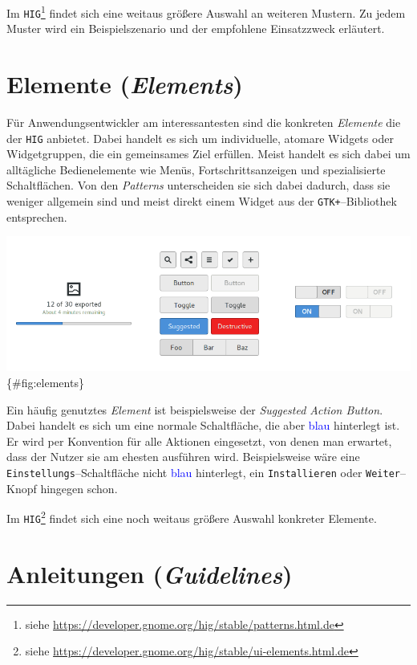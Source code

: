\documentclass[11pt,ngerman,toc=listof,index=totoc]{scrreprt}
\begin{document}
Im \texttt{HIG}\footnote{siehe
  \url{https://developer.gnome.org/hig/stable/patterns.html.de}} findet
sich eine weitaus größere Auswahl an weiteren Mustern. Zu jedem Muster
wird ein Beispielszenario und der empfohlene Einsatzzweck erläutert.

\section{\texorpdfstring{Elemente
(\emph{Elements})}{Elemente (Elements)}}\label{elemente-elements}

Für Anwendungsentwickler am interessantesten sind die konkreten
\emph{Elemente} die der \texttt{HIG} anbietet. Dabei handelt es sich um
individuelle, atomare Widgets oder Widgetgruppen, die ein gemeinsames
Ziel erfüllen. Meist handelt es sich dabei um alltägliche Bedienelemente
wie Menüs, Fortschrittsanzeigen und spezialisierte Schaltflächen. Von
den \emph{Patterns} unterscheiden sie sich dabei dadurch, dass sie
weniger allgemein sind und meist direkt einem Widget aus der
\texttt{GTK+}--Bibliothek entsprechen.

\includegraphics{docs/pics/elements.png} \{\#fig:elements\}

Ein häufig genutztes \emph{Element} ist beispielsweise der
\emph{Suggested Action Button}. Dabei handelt es sich um eine normale
Schaltfläche, die aber \textcolor{blue}{blau} hinterlegt ist. Er wird
per Konvention für alle Aktionen eingesetzt, von denen man erwartet,
dass der Nutzer sie am ehesten ausführen wird. Beispielsweise wäre eine
\texttt{Einstellungs}--Schaltfläche nicht \textcolor{blue}{blau}
hinterlegt, ein \texttt{Installieren} oder \texttt{Weiter}--Knopf
hingegen schon.

Im \texttt{HIG}\footnote{siehe
  \url{https://developer.gnome.org/hig/stable/ui-elements.html.de}}
findet sich eine noch weitaus größere Auswahl konkreter Elemente.

\section{\texorpdfstring{Anleitungen
(\emph{Guidelines})}{Anleitungen (Guidelines)}}\label{anleitungen-guidelines}
\end{document}
